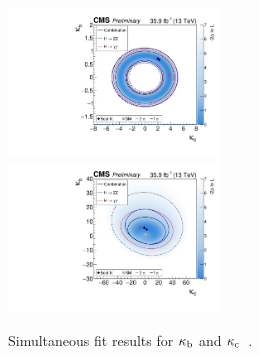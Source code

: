 \begin{figure}[!ht]
\begin{center}
\includegraphics[width=0.5\textwidth]{Fig/CMS-PAS-HIG-17-028_Figure_006-a}~
\includegraphics[width=0.5\textwidth]{Fig/CMS-PAS-HIG-17-028_Figure_006-b}\\
\caption{Simultaneous fit results for $\kappa_{\mathrm{b}}$ and $\kappa_{\mathrm{c}}$~\cite{CMS-PAS-HIG-17-028}. \label{fig:HiggsPt_KappaC_CMS2016}}
\end{center}
\end{figure}

